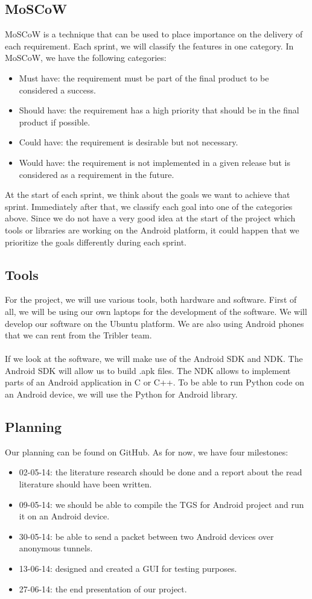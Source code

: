 \subsection{MoSCoW}
MoSCoW is a technique that can be used to place importance on the delivery of each requirement. Each sprint, we will classify the features in one category. In MoSCoW, we have the following categories:
\begin{itemize}
\item Must have: the requirement must be part of the final product to be considered a success.
\item Should have: the requirement has a high priority that should be in the final product if possible.
\item Could have: the requirement is desirable but not necessary.
\item Would have: the requirement is not implemented in a given release but is considered as a requirement in the future.
\end{itemize}
At the start of each sprint, we think about the goals we want to achieve that sprint. Immediately after that, we classify each goal into one of the categories above. Since we do not have a very good idea at the start of the project which tools or libraries are working on the Android platform, it could happen that we prioritize the goals differently during each sprint.

\subsection{Tools}
For the project, we will use various tools, both hardware and software. First of all, we will be using our own laptops for the development of the software. We will develop our software on the Ubuntu platform. We are also using Android phones that we can rent from the Tribler team.\\\\
If we look at the software, we will make use of the Android SDK and NDK. The Android SDK will allow us to build .apk files. The NDK allows to implement parts of an Android application in C or C++. To be able to run Python code on an Android device, we will use the Python for Android library.

\subsection{Planning}
Our planning can be found on GitHub. As for now, we have four milestones:
\begin{itemize}
\item 02-05-14: the literature research should be done and a report about the read literature should have been written.
\item 09-05-14: we should be able to compile the TGS for Android project and run it on an Android device.
\item 30-05-14: be able to send a packet between two Android devices over anonymous tunnels.
\item 13-06-14: designed and created a GUI for testing purposes.
\item 27-06-14: the end presentation of our project.
\end{itemize}

